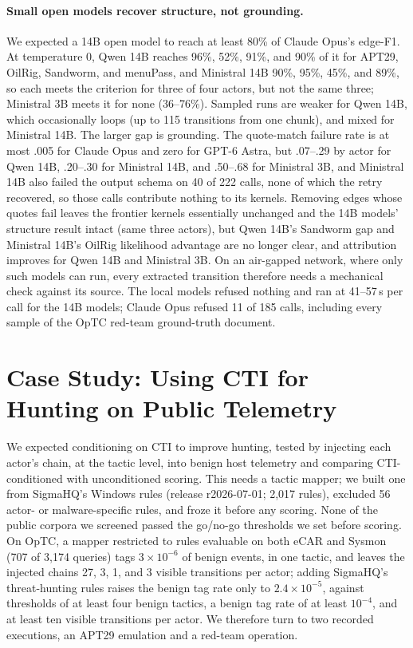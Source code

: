 \documentclass[letterpaper]{article} %
\begin{document}
\paragraph{Small open models recover structure, not grounding.} We expected a 14B open model to reach at least 80\% of Claude Opus's edge-F1. At temperature 0, Qwen 14B reaches 96\%, 52\%, 91\%, and 90\% of it for APT29, OilRig, Sandworm, and menuPass, and Ministral 14B 90\%, 95\%, 45\%, and 89\%, so each meets the criterion for three of four actors, but not the same three; Ministral 3B meets it for none (36--76\%). Sampled runs are weaker for Qwen 14B, which occasionally loops (up to 115 transitions from one chunk), and mixed for Ministral 14B. The larger gap is grounding. The quote-match failure rate is at most .005 for Claude Opus and zero for GPT-6 Astra, but .07--.29 by actor for Qwen 14B, .20--.30 for Ministral 14B, and .50--.68 for Ministral 3B, and Ministral 14B also failed the output schema on 40 of 222 calls, none of which the retry recovered, so those calls contribute nothing to its kernels. Removing edges whose quotes fail leaves the frontier kernels essentially unchanged and the 14B models' structure result intact (same three actors), but Qwen 14B's Sandworm gap and Ministral 14B's OilRig likelihood advantage are no longer clear, and attribution improves for Qwen 14B and Ministral 3B. On an air-gapped network, where only such models can run, every extracted transition therefore needs a mechanical check against its source. The local models refused nothing and ran at 41--57\,s per call for the 14B models; Claude Opus refused 11 of 185 calls, including every sample of the OpTC red-team ground-truth document.

\section{Case Study: Using CTI for Hunting on Public Telemetry}

We expected conditioning on CTI to improve hunting, tested by injecting each actor's chain, at the tactic level, into benign host telemetry and comparing CTI-conditioned with unconditioned scoring. This needs a tactic mapper; we built one from SigmaHQ's Windows rules \citep{sigmahq} (release r2026-07-01; 2,017 rules), excluded 56 actor- or malware-specific rules, and froze it before any scoring. None of the public corpora we screened passed the go/no-go thresholds we set before scoring. On OpTC, a mapper restricted to rules evaluable on both eCAR and Sysmon (707 of 3,174 queries) tags $3\times10^{-6}$ of benign events, in one tactic, and leaves the injected chains 27, 3, 1, and 3 visible transitions per actor; adding SigmaHQ's threat-hunting rules raises the benign tag rate only to $2.4\times10^{-5}$, against thresholds of at least four benign tactics, a benign tag rate of at least $10^{-4}$, and at least ten visible transitions per actor. We therefore turn to two recorded executions, an APT29 emulation and a red-team operation.
\end{document}
